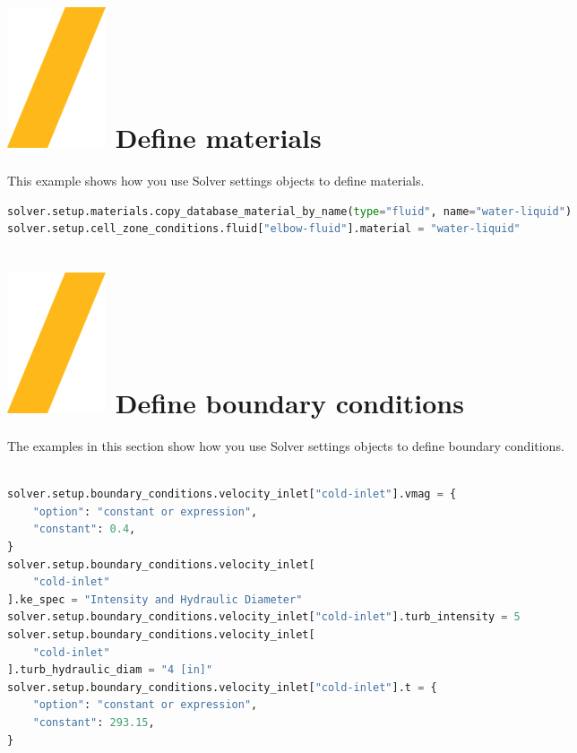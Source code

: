 \documentclass[9pt,landscape]{article}
\begin{document}
\begin{multicols}{3}
{%
\vfill
\section{\includegraphics[height=\fontcharht\font`\S]{slash.png}  Define materials}
This example shows how you use Solver settings objects to define materials.
\begin{lstlisting}[language=Python]
solver.setup.materials.copy_database_material_by_name(type="fluid", name="water-liquid")
solver.setup.cell_zone_conditions.fluid["elbow-fluid"].material = "water-liquid"
\end{lstlisting} 

\section{\includegraphics[height=\fontcharht\font`\S]{slash.png}  Define boundary conditions}

The examples in this section show how you use Solver settings objects to define boundary conditions.

\begin{lstlisting}[language=Python]

solver.setup.boundary_conditions.velocity_inlet["cold-inlet"].vmag = {
    "option": "constant or expression",
    "constant": 0.4,
}
solver.setup.boundary_conditions.velocity_inlet[
    "cold-inlet"
].ke_spec = "Intensity and Hydraulic Diameter"
solver.setup.boundary_conditions.velocity_inlet["cold-inlet"].turb_intensity = 5
solver.setup.boundary_conditions.velocity_inlet[
    "cold-inlet"
].turb_hydraulic_diam = "4 [in]"
solver.setup.boundary_conditions.velocity_inlet["cold-inlet"].t = {
    "option": "constant or expression",
    "constant": 293.15,
}
\end{lstlisting} 

}
\end{multicols}
\end{document}
